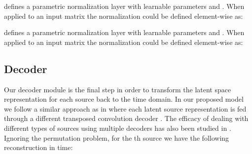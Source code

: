 \begin{definition}
 defines a parametric normalization layer \cite{ba2016layernormalization} with learnable parameters  and . When applied to an input matrix  the normalization could be defined element-wise as:

\end{definition}

\begin{definition}
 defines a parametric normalization layer with learnable parameters  and . When applied to an input matrix  the normalization could be defined element-wise as:

\end{definition}

\subsection{Decoder}
\label{sec:net_arch:decoder}
Our decoder module  is the final step in order to transform the latent space representation  for each source back to the time domain. In our proposed model we follow a similar approach as in \cite{tzinis2019two} where each latent source representation  is fed through a different transposed convolution decoder . The efficacy of dealing with different types of sources using multiple decoders has also been studied in \cite{differentdecoders}. Ignoring the permutation problem, for the th source we have the following reconstruction in time: 


